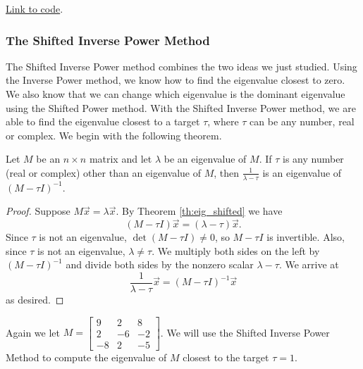 \documentclass{ximera}
\begin{document}
\href{https://sagecell.sagemath.org/?z=eJxVT01vgzAMvSPxH3yplLSLNlp16sYyCVU99MCqtWyXqgcG6YhUEhTCCv9-5mMqc6TE9vN7fplAlAkoM3m2IoVCX4WBXNhMp64T8uMTzGHlg-vMgT0Cm7cpW2GTLU--6wj5TULqOglnCywDHrJkKhpBFhR6NEC0lkpafvR8PCcfJltVVBZiBW1fxhf4EYnVxnXyuJYWuLfEoXWmdSlAVfkXWpJWmNhKrUqUAw6dJG5MdKWQAQ-YG97egHHN5EVAj71Ap9oDDa-HkVYkmDZD1YY8D4xXVINb33BiTazKAu2Qhk5rev-_0dCRyv79YxdtN2_RgXRqlJsRKlTaF3---3cG3jD0uVlHu_2BPN8N7NZvxxoQ17ltGOek-yXz6Cz5Bb3rfN0=&lang=octave&interacts=eJyLjgUAARUAuQ==}{Link to code}.

\subsubsection*{The Shifted Inverse Power Method}

The Shifted Inverse Power method combines the two ideas we just studied.  Using the Inverse Power method, we know how to find the eigenvalue closest to zero.  We also know that we can change which eigenvalue is the dominant eigenvalue using the Shifted Power method.  With the Shifted Inverse Power method, we are able to find the eigenvalue closest to a target $\tau$, where $\tau$ can be any number, real or complex.    We begin with the following theorem.

\begin{theorem}\label{th:eig_shifted_inverse}
Let $M$ be an $n \times n$ matrix and let $\lambda$ be an eigenvalue of $M$.  If $\tau$ is any number (real or complex) other than an eigenvalue of $M$, then $\frac{1}{\lambda - \tau}$ is an eigenvalue of $(M - \tau I)^{-1}$.
\end{theorem}

\begin{proof}
Suppose $M\vec{x}=\lambda\vec{x}$.  By Theorem \ref{th:eig_shifted} we have 
$$(M - \tau I)\vec{x}=(\lambda-\tau)\vec{x}.$$  
Since $\tau$ is not an eigenvalue, $\det (M - \tau I) \ne 0$, so $M - \tau I$ is invertible.  Also, since $\tau$ is not an eigenvalue, $\lambda \ne \tau$.  We multiply both sides on the left by $(M - \tau I)^{-1}$ and divide both sides by the nonzero scalar $\lambda - \tau$.  We arrive at 
$$\frac{1}{\lambda - \tau}\vec{x} = (M - \tau I)^{-1}\vec{x}$$
as desired.
\end{proof}

Again we let $M=\left[ \begin{array}{rrr}
9 & 2 & 8 \\
2 & -6 & -2 \\
-8 & 2 & -5
\end{array}\right]$.  We will use the Shifted Inverse Power Method to compute the eigenvalue of $M$ closest to the target $\tau = 1$. 
\end{document}
